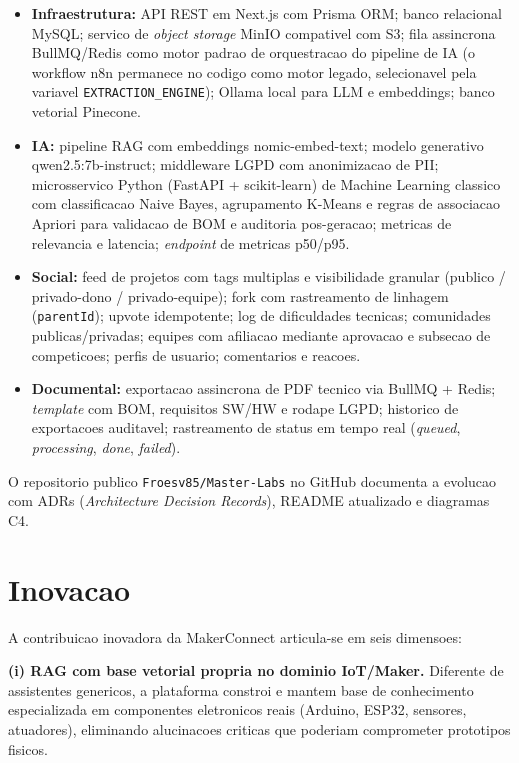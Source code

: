 \documentclass[portuguese]{sbcreviews-2025}%
\begin{document}
\begin{itemize}
  \item \textbf{Infraestrutura:} API REST em Next.js com Prisma ORM; banco relacional MySQL; servico de \textit{object storage} MinIO compativel com S3; fila assincrona BullMQ/Redis como motor padrao de orquestracao do pipeline de IA (o workflow n8n permanece no codigo como motor legado, selecionavel pela variavel \texttt{EXTRACTION\_ENGINE}); Ollama local para LLM e embeddings; banco vetorial Pinecone.
  \item \textbf{IA:} pipeline RAG com embeddings nomic-embed-text; modelo generativo qwen2.5:7b-instruct; middleware LGPD com anonimizacao de PII; microsservico Python (FastAPI + scikit-learn) de Machine Learning classico com classificacao Naive Bayes, agrupamento K-Means e regras de associacao Apriori para validacao de BOM e auditoria pos-geracao; metricas de relevancia e latencia; \textit{endpoint} de metricas p50/p95.
  \item \textbf{Social:} feed de projetos com tags multiplas e visibilidade granular (publico / privado-dono / privado-equipe); fork com rastreamento de linhagem (\texttt{parentId}); upvote idempotente; log de dificuldades tecnicas; comunidades publicas/privadas; equipes com afiliacao mediante aprovacao e subsecao de competicoes; perfis de usuario; comentarios e reacoes.
  \item \textbf{Documental:} exportacao assincrona de PDF tecnico via BullMQ + Redis; \textit{template} com BOM, requisitos SW/HW e rodape LGPD; historico de exportacoes auditavel; rastreamento de status em tempo real (\textit{queued}, \textit{processing}, \textit{done}, \textit{failed}).
\end{itemize}

O repositorio publico \texttt{Froesv85/Master-Labs} no GitHub documenta a evolucao com ADRs (\textit{Architecture Decision Records}), README atualizado e diagramas C4.

\section{Inovacao}

A contribuicao inovadora da MakerConnect articula-se em seis dimensoes:

\textbf{(i) RAG com base vetorial propria no dominio IoT/Maker.} Diferente de assistentes genericos, a plataforma constroi e mantem base de conhecimento especializada em componentes eletronicos reais (Arduino, ESP32, sensores, atuadores), eliminando alucinacoes criticas que poderiam comprometer prototipos fisicos.
\end{document}
